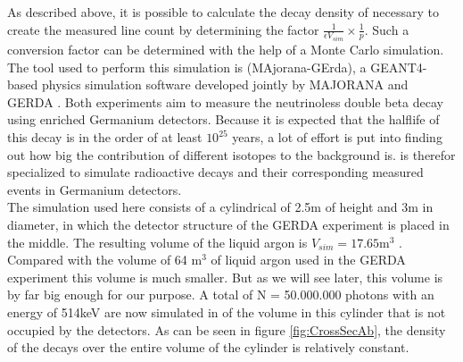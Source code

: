 \documentclass[encoding=utf8,british]{tumphthesis}
\begin{document}
As described above, it is possible to calculate the decay density of \Kr necessary to create the measured line count by determining the factor $\frac{1}{\epsilon V_{sim}} \times \frac{1}{p}$. 
Such a conversion factor can be determined with the help of a Monte Carlo simulation.
The tool used to perform this simulation is \mage (MAjorana-GErda), a GEANT4-based physics simulation software developed jointly by MAJORANA and GERDA \cite{boswell_mage_2010}.
Both experiments aim to measure the neutrinoless double beta decay using enriched Germanium detectors.
Because it is expected that the halflife of this decay is in the order of at least \(10^{25}\) years, a lot of effort is put into finding out how big the contribution of different isotopes to the background is.
\mage is therefor specialized to simulate radioactive decays and their corresponding measured events in Germanium detectors.
\\

The simulation used here consists of a cylindrical of 2.5m of height and 3m in diameter, in which the detector structure of the GERDA experiment is placed in the middle.
The resulting volume of the liquid argon is $V_{sim} = 17.65 \mathrm{m}^3$ .
Compared with the volume of 64 m\(^3\) of liquid argon used in the GERDA experiment this volume is much smaller.
But as we will see later, this volume is by far big enough for our purpose.
A total of N = 50.000.000 photons with an energy of 514keV are now simulated in of the volume in this cylinder that is not occupied by the detectors. 
As can be seen in figure \ref{fig:CrossSecAb}, the density of the decays over the entire volume of the cylinder is relatively constant.
\\
\end{document}
